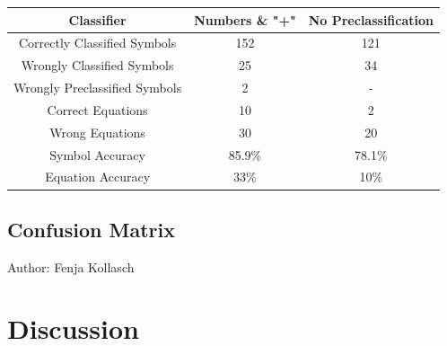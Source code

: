 \documentclass[12pt]{article}
\begin{document}
	\begin{center}
		\begin{tabular}{|c|| c | c|} 
			\hline
			 Classifier & Numbers \& "+" & No Preclassification \\
			\hline\hline
			Correctly Classified Symbols & 152 & 121 \\ 
			\hline
			Wrongly Classified Symbols& 25 & 34\\
			\hline
			Wrongly Preclassified Symbols & 2 & - \\
			\hline
			Correct Equations & 10 & 2\\
			\hline
			Wrong Equations & 30 & 20\\
			\hline
			Symbol Accuracy & 85.9\% & 78.1\% \\
			\hline
			Equation Accuracy & 33\% & 10\% \\
			\hline
		\end{tabular}\label{tab:Exp1}
	\end{center}
	
	
	
	
	
	
	
	
	\subsection{Confusion Matrix}
	\small{Author: Fenja Kollasch} \newline \newline
	
	\section{Discussion}
	
\end{document}
